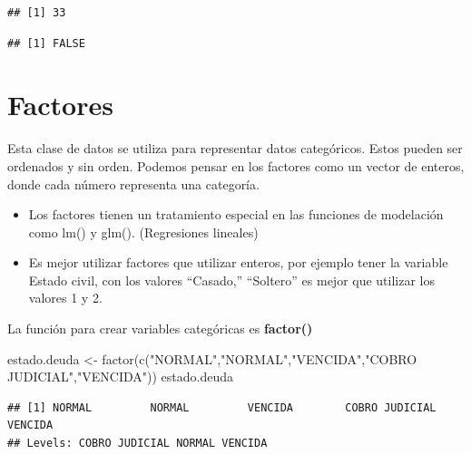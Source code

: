 \documentclass[
  12pt,
]{book}
\newenvironment{Shaded}{\begin{snugshade}}{\end{snugshade}}
\newcommand{\FunctionTok}[1]{\textcolor[rgb]{0.00,0.00,0.00}{#1}}
\newcommand{\NormalTok}[1]{#1}
\newcommand{\OtherTok}[1]{\textcolor[rgb]{0.56,0.35,0.01}{#1}}
\newcommand{\SpecialCharTok}[1]{\textcolor[rgb]{0.00,0.00,0.00}{#1}}
\newcommand{\StringTok}[1]{\textcolor[rgb]{0.31,0.60,0.02}{#1}}
\providecommand{\tightlist}{%
  \setlength{\itemsep}{0pt}\setlength{\parskip}{0pt}}
\begin{document}
\begin{verbatim}
## [1] 33
\end{verbatim}

\begin{Shaded}
\end{Shaded}

\begin{verbatim}
## [1] FALSE
\end{verbatim}

\hypertarget{factores}{%
\section{\texorpdfstring{\textbf{Factores}}{Factores}}\label{factores}}

Esta clase de datos se utiliza para representar datos categóricos. Estos pueden ser ordenados y sin orden. Podemos pensar en los factores como un vector de enteros, donde cada número representa una categoría.

\begin{itemize}
\tightlist
\item
  Los factores tienen un tratamiento especial en las funciones de modelación como lm() y glm(). (Regresiones lineales)
\item
  Es mejor utilizar factores que utilizar enteros, por ejemplo tener la variable Estado civil, con los valores ``Casado,'' ``Soltero'' es mejor que utilizar los valores 1 y 2.
\end{itemize}

La función para crear variables categóricas es \textbf{factor()}

\begin{Shaded}
\begin{Highlighting}[]
\NormalTok{estado.deuda }\OtherTok{\textless{}{-}} \FunctionTok{factor}\NormalTok{(}\FunctionTok{c}\NormalTok{(}\StringTok{"NORMAL"}\NormalTok{,}\StringTok{"NORMAL"}\NormalTok{,}\StringTok{"VENCIDA"}\NormalTok{,}\StringTok{"COBRO JUDICIAL"}\NormalTok{,}\StringTok{"VENCIDA"}\NormalTok{))}
\NormalTok{estado.deuda}
\end{Highlighting}
\end{Shaded}

\begin{verbatim}
## [1] NORMAL         NORMAL         VENCIDA        COBRO JUDICIAL VENCIDA       
## Levels: COBRO JUDICIAL NORMAL VENCIDA
\end{verbatim}
\end{document}
